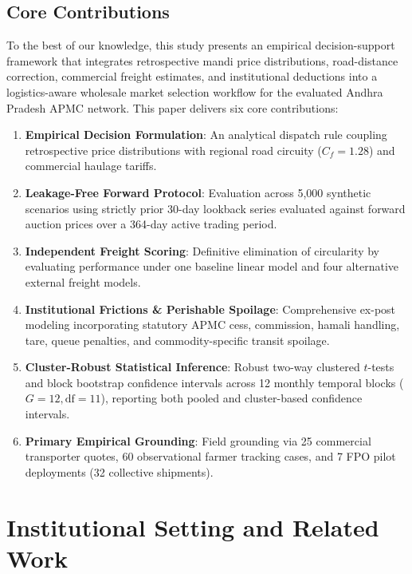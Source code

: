 \documentclass[journal]{IEEEtran}
\begin{document}
\subsection{Core Contributions}
To the best of our knowledge, this study presents an empirical decision-support framework that integrates retrospective mandi price distributions, road-distance correction, commercial freight estimates, and institutional deductions into a logistics-aware wholesale market selection workflow for the evaluated Andhra Pradesh APMC network. This paper delivers six core contributions:
\begin{enumerate}
    \item \textbf{Empirical Decision Formulation}: An analytical dispatch rule coupling retrospective price distributions with regional road circuity ($C_f = 1.28$) and commercial haulage tariffs.
    \item \textbf{Leakage-Free Forward Protocol}: Evaluation across 5,000 synthetic scenarios using strictly prior 30-day lookback series evaluated against forward auction prices over a 364-day active trading period.
    \item \textbf{Independent Freight Scoring}: Definitive elimination of circularity by evaluating performance under one baseline linear model and four alternative external freight models.
    \item \textbf{Institutional Frictions \& Perishable Spoilage}: Comprehensive ex-post modeling incorporating statutory APMC cess, commission, hamali handling, tare, queue penalties, and commodity-specific transit spoilage.
    \item \textbf{Cluster-Robust Statistical Inference}: Robust two-way clustered $t$-tests and block bootstrap confidence intervals across 12 monthly temporal blocks ($G = 12, \text{df} = 11$), reporting both pooled and cluster-based confidence intervals.
    \item \textbf{Primary Empirical Grounding}: Field grounding via 25 commercial transporter quotes, 60 observational farmer tracking cases, and 7 FPO pilot deployments (32 collective shipments).
\end{enumerate}

\section{Institutional Setting and Related Work}
\end{document}
